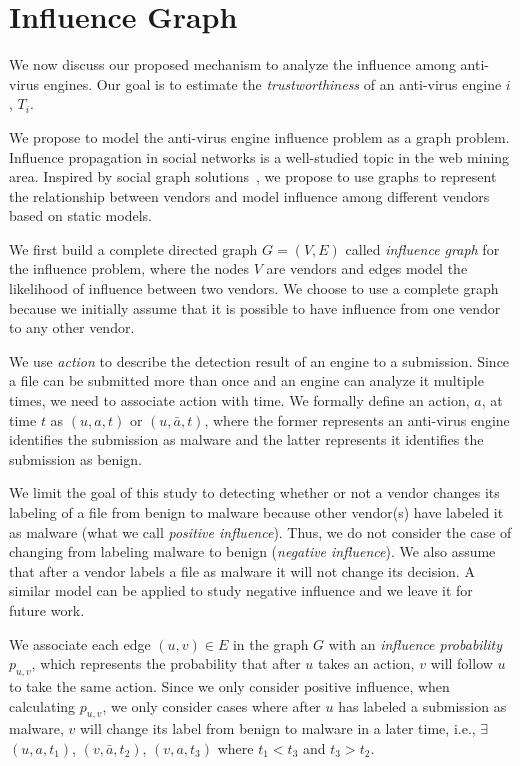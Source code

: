\section{Influence Graph}
\label{sec:model}
We now discuss our proposed mechanism to analyze the influence among anti-virus engines.
Our goal is to estimate the {\em trustworthiness} of an anti-virus engine $i$, $T_i$.

We propose to model the anti-virus engine influence problem as a graph problem.
Influence propagation in social networks is a well-studied topic in the web mining area. 
Inspired by social graph solutions~\cite{Influence}, we propose to use graphs to represent the relationship between vendors 
and model influence among different vendors based on static models.

We first build a complete directed graph $G = (V, E)$ called {\em influence graph} for the influence problem, 
where the nodes $V$ are vendors and edges model the likelihood of influence between two vendors. 
We choose to use a complete graph because we initially assume that it is possible to have influence from one vendor to any other vendor.

We use {\em action} to describe the detection result of an engine to a submission. Since a file can be
submitted more than once and an engine can analyze it multiple times, we need to associate action with
time. We formally define an action, $a$, at time $t$ as $(u, a, t)$ or $(u, \bar{a}, t)$,
where the former represents an anti-virus engine identifies the submission as malware 
and the latter represents it identifies the submission as benign.

We limit the goal of this study to detecting whether or not a vendor changes its labeling of a file from
benign to malware because other vendor(s) have labeled it as malware (what we call {\em positive influence}). 
Thus, we do not consider the case of changing from labeling malware to benign ({\em negative influence}). 
We also assume that after a vendor labels a file as malware it will not change its decision.
A similar model can be applied to study negative influence and we leave it for future work.

We associate each edge $(u, v) \in E$ in the graph $G$ 
with an {\em influence probability} $p_{u,v}$,
which represents the probability that after $u$ takes an action, 
$v$ will follow $u$ to take the same action.
Since we only consider positive influence, 
when calculating $p_{u,v}$, we only consider cases where after $u$ has labeled a submission as malware, 
$v$ will change its label from benign to malware in a later time, i.e., 
$\exists$  $(u, a, t_1)$, $(v, \bar{a}, t_2)$, $(v, a, t_3)$ where $t_1<t_3$ and $t_3>t_2$. 

